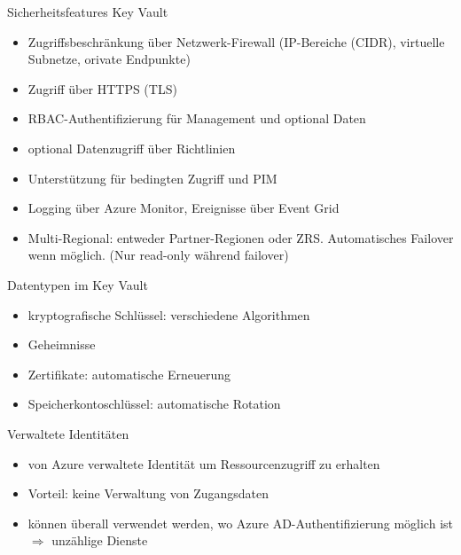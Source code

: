 \begin{flashcard}[Definition]{Sicherheitsfeatures Key Vault}
  \begin{itemize}
    \item Zugriffsbeschränkung über Netzwerk-Firewall\newline
      (IP-Bereiche (CIDR), virtuelle Subnetze, orivate Endpunkte)
    \item Zugriff über HTTPS (TLS)
    \item RBAC-Authentifizierung für Management und optional Daten
    \item optional Datenzugriff über Richtlinien
    \item Unterstützung für bedingten Zugriff und PIM
    \item Logging über Azure Monitor, Ereignisse über Event Grid
    \item Multi-Regional: entweder Partner-Regionen oder ZRS.\newline
      Automatisches Failover wenn möglich. (Nur read-only während failover)
  \end{itemize}
\end{flashcard}

\begin{flashcard}[Definition]{Datentypen im Key Vault}
  \begin{itemize}
    \item kryptografische Schlüssel: verschiedene Algorithmen
    \item Geheimnisse
    \item Zertifikate: automatische Erneuerung
    \item Speicherkontoschlüssel: automatische Rotation
  \end{itemize}
\end{flashcard}


\begin{flashcard}[Definition]{Verwaltete Identitäten}
  \begin{itemize}
    \item von Azure verwaltete Identität um Ressourcenzugriff zu erhalten
    \item Vorteil: keine Verwaltung von Zugangsdaten
    \item können überall verwendet werden, wo Azure AD-Authentifizierung möglich ist\newline
      $\Rightarrow$ unzählige Dienste
  \end{itemize}
\end{flashcard}

